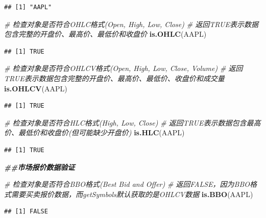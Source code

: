 \documentclass[]{ctexbook}
\newenvironment{Shaded}{\begin{snugshade}}{\end{snugshade}}
\newcommand{\CommentTok}[1]{\textcolor[rgb]{0.56,0.35,0.01}{\textit{#1}}}
\newcommand{\DocumentationTok}[1]{\textcolor[rgb]{0.56,0.35,0.01}{\textbf{\textit{#1}}}}
\newcommand{\FunctionTok}[1]{\textcolor[rgb]{0.13,0.29,0.53}{\textbf{#1}}}
\newcommand{\NormalTok}[1]{#1}
\begin{document}
\begin{verbatim}
## [1] "AAPL"
\end{verbatim}

\begin{Shaded}
\begin{Highlighting}[]
\CommentTok{\# 检查对象是否符合OHLC格式(Open, High, Low, Close)}
\CommentTok{\# 返回TRUE表示数据包含完整的开盘价、最高价、最低价和收盘价}
\FunctionTok{is.OHLC}\NormalTok{(AAPL)}
\end{Highlighting}
\end{Shaded}

\begin{verbatim}
## [1] TRUE
\end{verbatim}

\begin{Shaded}
\begin{Highlighting}[]
\CommentTok{\# 检查对象是否符合OHLCV格式(Open, High, Low, Close, Volume)}
\CommentTok{\# 返回TRUE表示数据包含完整的开盘价、最高价、最低价、收盘价和成交量}
\FunctionTok{is.OHLCV}\NormalTok{(AAPL)}
\end{Highlighting}
\end{Shaded}

\begin{verbatim}
## [1] TRUE
\end{verbatim}

\begin{Shaded}
\begin{Highlighting}[]
\CommentTok{\# 检查对象是否符合HLC格式(High, Low, Close)}
\CommentTok{\# 返回TRUE表示数据包含最高价、最低价和收盘价(但可能缺少开盘价)}
\FunctionTok{is.HLC}\NormalTok{(AAPL)}
\end{Highlighting}
\end{Shaded}

\begin{verbatim}
## [1] TRUE
\end{verbatim}

\begin{Shaded}
\begin{Highlighting}[]
\DocumentationTok{\#\#市场报价数据验证}

\CommentTok{\# 检查对象是否符合BBO格式(Best Bid and Offer)}
\CommentTok{\# 返回FALSE，因为BBO格式需要买卖报价数据，而getSymbols默认获取的是OHLCV数据}
\FunctionTok{is.BBO}\NormalTok{(AAPL)}
\end{Highlighting}
\end{Shaded}

\begin{verbatim}
## [1] FALSE
\end{verbatim}
\end{document}
